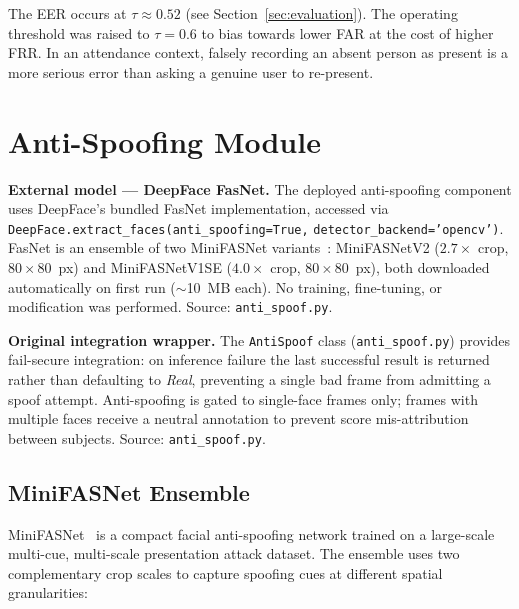 \documentclass[11pt,a4paper]{article}
\begin{document}
The EER occurs at $\tau \approx 0.52$ (see Section~\ref{sec:evaluation}).
The operating threshold was raised to $\tau = 0.6$ to bias towards lower FAR at
the cost of higher FRR.
In an attendance context, falsely recording an absent person as present is a
more serious error than asking a genuine user to re-present.

\section{Anti-Spoofing Module}
\label{sec:antispoof}

\begin{externalbox}
  \textbf{External model --- DeepFace FasNet.}
  The deployed anti-spoofing component uses DeepFace's bundled FasNet implementation,
  accessed via \texttt{DeepFace.extract\_faces(anti\_spoofing=True,}
  \texttt{detector\_backend='opencv')}.
  FasNet is an ensemble of two MiniFASNet variants~\cite{liu2021minifasnet}:
  MiniFASNetV2 ($2.7\times$ crop, $80\times 80$~px) and MiniFASNetV1SE
  ($4.0\times$ crop, $80\times 80$~px), both downloaded automatically on first run
  ($\sim$10~MB each).
  No training, fine-tuning, or modification was performed.
  Source: \texttt{anti\_spoof.py}.
\end{externalbox}

\begin{originalbox}
  \textbf{Original integration wrapper.}
  The \texttt{AntiSpoof} class (\texttt{anti\_spoof.py}) provides fail-secure
  integration: on inference failure the last successful result is returned rather
  than defaulting to \textit{Real}, preventing a single bad frame from admitting
  a spoof attempt.
  Anti-spoofing is gated to single-face frames only; frames with multiple faces
  receive a neutral annotation to prevent score mis-attribution between subjects.
  Source: \texttt{anti\_spoof.py}.
\end{originalbox}

\subsection{MiniFASNet Ensemble}

MiniFASNet~\cite{liu2021minifasnet} is a compact facial anti-spoofing network trained
on a large-scale multi-cue, multi-scale presentation attack dataset.
The ensemble uses two complementary crop scales to capture spoofing cues at different
spatial granularities:
\end{document}
